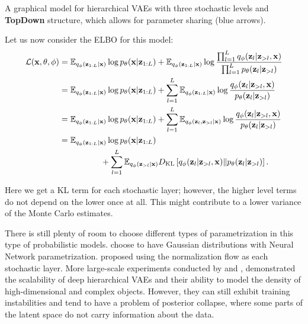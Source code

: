 \begin{marginfigure}
\caption{A graphical model for hierarchical VAEs with three stochastic levels and  \textbf{TopDown} structure, which allows for parameter sharing (blue arrows).} \label{fig:intro_top_down}
\end{marginfigure}

Let us now consider the ELBO for this model:
\begin{align}
    \mathcal{L}({\mathbf{x}}, \theta, \phi) &= \mathbb{E}_{q_{\phi}({\mathbf{z}}_{1:L}|{\mathbf{x}})}\log p_{\theta}({\mathbf{x}}|{\mathbf{z}}_{1:L}) + \mathbb{E}_{q_{\phi}({\mathbf{z}}_{1:L}|{\mathbf{x}})} \log \frac{\prod_{l=1}^L q_{\phi}({\mathbf{z}}_l|{\mathbf{z}}_{>l}, {\mathbf{x}})}{\prod_{l=1}^L p_{\theta}({\mathbf{z}}_l|{\mathbf{z}}_{>l})} \\
    &=\mathbb{E}_{q_{\phi}({\mathbf{z}}_{1:L}|{\mathbf{x}})}\log p_{\theta}({\mathbf{x}}|{\mathbf{z}}_{1:L}) +  \sum_{l=1}^L \mathbb{E}_{q_{\phi}({\mathbf{z}}_{1:L}|{\mathbf{x}})}\log \frac{ q_{\phi}({\mathbf{z}}_l|{\mathbf{z}}_{>l}, {\mathbf{x}})}{p_{\theta}({\mathbf{z}}_l|{\mathbf{z}}_{>l})} \\
    &=\mathbb{E}_{q_{\phi}({\mathbf{z}}_{1:L}|{\mathbf{x}})}\log p_{\theta}({\mathbf{x}}|{\mathbf{z}}_{1:L}) +  \sum_{l=1}^L \mathbb{E}_{q_{\phi}({\mathbf{z}}_{l},{\mathbf{z}}_{>l}| {\mathbf{x}})}\log \frac{ q_{\phi}({\mathbf{z}}_l|{\mathbf{z}}_{>l}, {\mathbf{x}})}{p_{\theta}({\mathbf{z}}_l|{\mathbf{z}}_{>l})} \\
    &=\mathbb{E}_{q_{\phi}({\mathbf{z}}_{1:L}|{\mathbf{x}})}\log p_{\theta}({\mathbf{x}}|{\mathbf{z}}_{1:L}) \notag\\
    &\quad\quad\quad\quad\quad +  \sum_{l=1}^L \mathbb{E}_{q_{\phi}({\mathbf{z}}_{>l}| {\mathbf{x}})}D_{\mathrm{KL}}\left[q_{\phi}({\mathbf{z}}_l|{\mathbf{z}}_{>l}, {\mathbf{x}})\|p_{\theta}({\mathbf{z}}_l|{\mathbf{z}}_{>l})\right].
\end{align}

Here we get a KL term for each stochastic layer; however, the higher level terms do not depend on the lower once at all. This might contribute to a lower variance of the Monte Carlo estimates.

There is still plenty of room to choose different types of parametrization in this type of probabilistic models. 
\citet{sonderby2016ladder} choose to have Gaussian distributions with Neural Network parametrization. 
\citet{kingma2016improved} proposed using the normalization flow as each stochastic layer. 
More large-scale experiments conducted by \citet{vahdat2020nvae} and \citet{Child2020-ze}, demonstrated the scalability of deep hierarchical VAEs and their ability to model the density of high-dimensional and complex objects.
However, they can still exhibit training instabilities and tend to have a problem of posterior collapse, where some parts of the latent space do not carry information about the data. 

